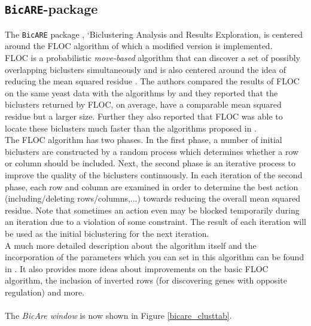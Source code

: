 \documentclass[a4paper]{article}\usepackage[]{graphicx}\usepackage[]{color}
\begin{document}
\subsection{\texttt{BicARE}-package}
The \verb|BicARE| package \citep{Gestraud2014a}, `Biclustering Analysis and
Results Exploration, is centered around the FLOC algorithm \citep{Yang2005} of
which a modified version is implemented.\\
FLOC is a probabilistic {\it move-based} algorithm that can discover a set of
possibly overlapping biclusters simultaneously and is also centered around the idea of
reducing the mean squared residue \citep{Cheng2000}. The authors compared the
results of FLOC on the same yeast data with the algorithms by \citet{Cheng2000}
and they reported that the biclusters returned by FLOC, on average, have a
comparable mean squared residue but a larger size. Further they also reported
that FLOC was able to locate these biclusters much faster than the algorithms
proposed in \citet{Cheng2000}.\\
The FLOC algorithm has two phases. In the first phase, a number of initial
biclusters are constructed by a random process which determines whether a row or
column should be included. Next, the second phase is an iterative process to
improve the quality of the biclusters continuously. In each iteration of the
second phase, each row and column are examined in order to determine the best
action (including/deleting rows/columns,...) towards reducing the overall mean squared residue. Note that sometimes
an action even may be blocked temporarily during an iteration due to a violation of
some constraint. The result of each iteration will be used as the initial
biclustering for the next iteration.\\
A much more detailed description about the algorithm itself and the
incorporation of the parameters which you can set in this algorithm can be found
in \citet{Yang2005}. It also provides more ideas about improvements on the basic
FLOC algorithm, the inclusion of inverted rows (for discovering genes with
opposite regulation) and more.
\\ \\
The {\it BicAre window} is now shown in Figure \ref{bicare_clusttab}.
\end{document}
